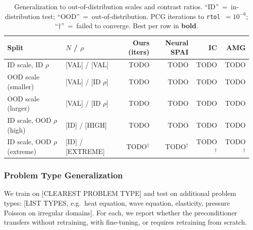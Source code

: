\documentclass[acmtog,anonymous,review]{acmart}
\begin{document}
\begin{table}[h]
\centering
\caption{Generalization to out-of-distribution scales and contrast ratios.
``ID''~=~in-distribution test; ``OOD''~=~out-of-distribution.
PCG iterations to \texttt{rtol}~$=10^{-6}$; ``$\dagger$''~=~failed to converge.
Best per row in \textbf{bold}.}
\label{tab:gen:scale}
\begin{tabular}{llrrrr}
\hline
Split & $N$ / $\rho$ & Ours (iters) & Neural SPAI & IC & AMG \\
\hline
ID scale, ID $\rho$        & [VAL] / [VAL]       & TODO & TODO & TODO & TODO \\
OOD scale (smaller)        & [VAL] / [ID $\rho$] & TODO & TODO & TODO & TODO \\
OOD scale (larger)         & [VAL] / [ID $\rho$] & TODO & TODO & TODO & TODO \\
ID scale, OOD $\rho$ (high)& [ID] / [HIGH]       & TODO & TODO & TODO & TODO \\
ID scale, OOD $\rho$ (extreme) & [ID] / [EXTREME] & TODO$^\dagger$ & TODO$^\dagger$ & TODO$^\dagger$ & TODO$^\dagger$ \\
\hline
\end{tabular}
\end{table}


\subsubsection{Problem Type Generalization}
\label{sec:results:gen:type}

We train on [CLEAREST PROBLEM TYPE] and test on additional problem types: [LIST TYPES, e.g.\
heat equation, wave equation, elasticity, pressure Poisson on irregular domains].
For each, we report whether the preconditioner transfers without retraining, with fine-tuning,
or requires retraining from scratch.
\end{document}
